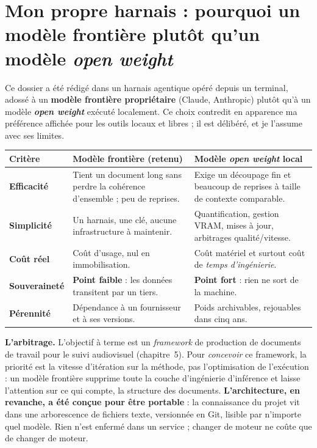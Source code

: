 \documentclass[11pt,a4paper]{report}
\begin{document}
\section{Mon propre harnais : pourquoi un modèle frontière plutôt qu'un modèle \emph{open weight}}
\label{sec:harnais}
Ce dossier a été rédigé dans un harnais agentique opéré depuis un terminal, adossé à un
\textbf{modèle frontière propriétaire} (Claude, Anthropic) plutôt qu'à un modèle
\textbf{\emph{open weight}} exécuté localement. Ce choix contredit en apparence ma préférence
affichée pour les outils locaux et libres ; il est délibéré, et je l'assume avec ses limites.

\begin{center}
\small
\begin{tabularx}{\textwidth}{>{\bfseries}p{3.1cm} Y Y}
\toprule
{}\textbf{Critère} & \textbf{Modèle frontière (retenu)} & \textbf{Modèle \emph{open weight} local} \\
\midrule
Efficacité & Tient un document long sans perdre la cohérence d'ensemble ; peu de reprises. & Exige un découpage fin et beaucoup de reprises à taille de contexte comparable. \\
Simplicité & Un harnais, une clé, aucune infrastructure à maintenir. & Quantification, gestion VRAM, mises à jour, arbitrages qualité/vitesse. \\
Coût réel & Coût d'usage, nul en immobilisation. & Coût matériel et surtout coût de \emph{temps d'ingénierie}. \\
Souveraineté & \textbf{Point faible} : les données transitent par un tiers. & \textbf{Point fort} : rien ne sort de la machine. \\
Pérennité & Dépendance à un fournisseur et à ses versions. & Poids archivables, rejouables dans cinq ans. \\
\bottomrule
\end{tabularx}
\end{center}

\textbf{L'arbitrage.} L'objectif à terme est un \emph{framework} de production de documents de
travail pour le suivi audiovisuel (chapitre~5). Pour \emph{concevoir} ce framework, la priorité est
la vitesse d'itération sur la méthode, pas l'optimisation de l'exécution : un modèle frontière
supprime toute la couche d'ingénierie d'inférence et laisse l'attention sur ce qui compte, la
structure des documents. \textbf{L'architecture, en revanche, a été conçue pour être portable} :
la connaissance du projet vit dans une arborescence de fichiers texte, versionnée en Git, lisible
par n'importe quel modèle. Rien n'est enfermé dans un service ; changer de moteur ne coûte que
de changer de moteur.
\end{document}
